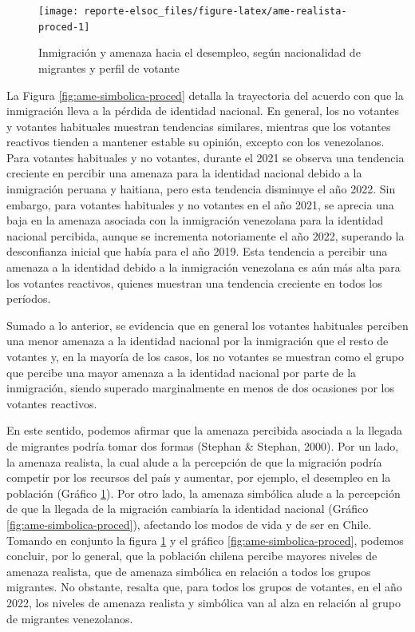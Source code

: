 \documentclass[
  12pt,
]{book}
\begin{document}
\begin{figure}

{\centering \texttt{[image: reporte-elsoc\_files/figure-latex/ame-realista-proced-1]} 

}

\caption{Inmigración y amenaza hacia el desempleo, según nacionalidad de migrantes y perfil de votante}\label{fig:ame-realista-proced}
\end{figure}

La Figura \ref{fig:ame-simbolica-proced} detalla la trayectoria del acuerdo con que la inmigración lleva a la pérdida de identidad nacional. En general, los no votantes y votantes habituales muestran tendencias similares, mientras que los votantes reactivos tienden a mantener estable su opinión, excepto con los venezolanos. Para votantes habituales y no votantes, durante el 2021 se observa una tendencia creciente en percibir una amenaza para la identidad nacional debido a la inmigración peruana y haitiana, pero esta tendencia disminuye el año 2022. Sin embargo, para votantes habituales y no votantes en el año 2021, se aprecia una baja en la amenaza asociada con la inmigración venezolana para la identidad nacional percibida, aunque se incrementa notoriamente el año 2022, superando la desconfianza inicial que había para el año 2019. Esta tendencia a percibir una amenaza a la identidad debido a la inmigración venezolana es aún más alta para los votantes reactivos, quienes muestran una tendencia creciente en todos los períodos.

Sumado a lo anterior, se evidencia que en general los votantes habituales perciben una menor amenaza a la identidad nacional por la inmigración que el resto de votantes y, en la mayoría de los casos, los no votantes se muestran como el grupo que percibe una mayor amenaza a la identidad nacional por parte de la inmigración, siendo superado marginalmente en menos de dos ocasiones por los votantes reactivos.

En este sentido, podemos afirmar que la amenaza percibida asociada a la llegada de migrantes podría tomar dos formas (Stephan \& Stephan, 2000). Por un lado, la amenaza realista, la cual alude a la percepción de que la migración podría competir por los recursos del país y aumentar, por ejemplo, el desempleo en la población (Gráfico \ref{fig:ame-realista-proced}). Por otro lado, la amenaza simbólica alude a la percepción de que la llegada de la migración cambiaría la identidad nacional (Gráfico \ref{fig:ame-simbolica-proced}), afectando los modos de vida y de ser en Chile. Tomando en conjunto la figura \ref{fig:ame-realista-proced} y el gráfico \ref{fig:ame-simbolica-proced}, podemos concluir, por lo general, que la población chilena percibe mayores niveles de amenaza realista, que de amenaza simbólica en relación a todos los grupos migrantes. No obstante, resalta que, para todos los grupos de votantes, en el año 2022, los niveles de amenaza realista y simbólica van al alza en relación al grupo de migrantes venezolanos.
\end{document}
